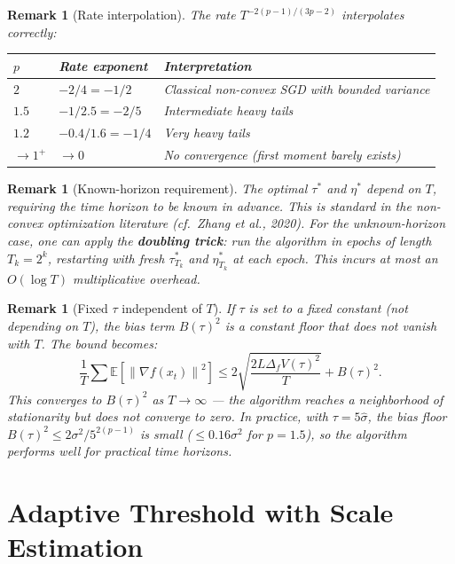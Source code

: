 \documentclass[11pt]{article}
\newtheorem{remark}[theorem]{Remark}
\theoremstyle{definition}
\newcommand{\E}{\mathbb{E}}
\newcommand{\norm}[1]{\left\| #1 \right\|}
\begin{document}
\begin{remark}[Rate interpolation]\label{rem:interp}
The rate $T^{-2(p-1)/(3p-2)}$ interpolates correctly:
\begin{center}
\renewcommand{\arraystretch}{1.2}
\begin{tabular}{lll}
\toprule
$p$ & Rate exponent & Interpretation \\
\midrule
$2$ & $-2/4 = -1/2$ & Classical non-convex SGD with bounded variance \\
$1.5$ & $-1/2.5 = -2/5$ & Intermediate heavy tails \\
$1.2$ & $-0.4/1.6 = -1/4$ & Very heavy tails \\
$\to 1^+$ & $\to 0$ & No convergence (first moment barely exists) \\
\bottomrule
\end{tabular}
\end{center}
\end{remark}

\begin{remark}[Known-horizon requirement]\label{rem:horizon}
The optimal $\tau^*$ and $\eta^*$ depend on $T$, requiring the time horizon
to be known in advance. This is standard in the non-convex optimization
literature (cf.\ Zhang et al., 2020). For the unknown-horizon case, one can
apply the \textbf{doubling trick}: run the algorithm in epochs of length
$T_k = 2^k$, restarting with fresh $\tau^*_{T_k}$ and $\eta^*_{T_k}$ at each
epoch. This incurs at most an $O(\log T)$ multiplicative overhead.
\end{remark}

\begin{remark}[Fixed $\tau$ independent of $T$]\label{rem:fixed_tau}
If $\tau$ is set to a fixed constant (not depending on $T$), the bias term
$B(\tau)^2$ is a constant \emph{floor} that does not vanish with $T$.
The bound becomes:
\[
  \frac{1}{T}\sum \E[\norm{\nabla f(x_t)}^2] \leq
  2\sqrt{\frac{2L\Delta_f V(\tau)^2}{T}} + B(\tau)^2.
\]
This converges to $B(\tau)^2$ as $T \to \infty$ — the algorithm reaches a
neighborhood of stationarity but does not converge to zero. In practice,
with $\tau = 5\hat{\sigma}$, the bias floor $B(\tau)^2 \leq 2\sigma^2/5^{2(p-1)}$
is small ($\leq 0.16\sigma^2$ for $p = 1.5$), so the algorithm performs well
for practical time horizons.
\end{remark}


\section{Adaptive Threshold with Scale Estimation}
\label{sec:adaptive}
\end{document}
